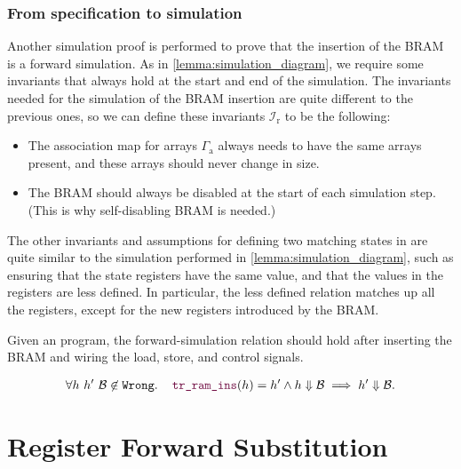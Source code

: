 \subsubsection{From specification to simulation}

Another simulation proof is performed to prove that the insertion of the
\gls{BRAM} is a forward simulation.  As in \cref{lemma:simulation_diagram}, we
require some invariants that always hold at the start and end of the simulation.
The invariants needed for the simulation of the \gls{BRAM} insertion are quite
different to the previous ones, so we can define these invariants
$\mathcal{I}_{\mathrm{r}}$ to be the following:

\begin{itemize}
\item The association map for arrays $\Gamma_{\mathrm{a}}$ always needs to have
  the same arrays present, and these arrays should never change in size.
\item The \gls{BRAM} should always be disabled at the start of each simulation
  step. (This is why self-disabling \gls{BRAM} is needed.)
\end{itemize}

The other invariants and assumptions for defining two matching states in \htl{}
are quite similar to the simulation performed in
\cref{lemma:simulation_diagram}, such as ensuring that the state registers have
the same value, and that the values in the registers are less defined.  In
particular, the less defined relation matches up all the registers, except for
the new registers introduced by the \gls{BRAM}.

\begin{lemma}\label{lemma:htl_ram}
  Given an \htl{} program, the forward-simulation relation should hold after
  inserting the \gls{BRAM} and wiring the load, store, and control signals.

  \begin{align*}
    \forall h\ h'\ \mathcal{B} \not\in \texttt{Wrong}\ldotp\quad \yhfunction{tr\_ram\_ins}(h) = h' \land h \Downarrow \mathcal{B} \implies h' \Downarrow \mathcal{B}.
  \end{align*}
\end{lemma}

\section{Register Forward Substitution}%
\label{sec:hg:register-forward-substitution}

